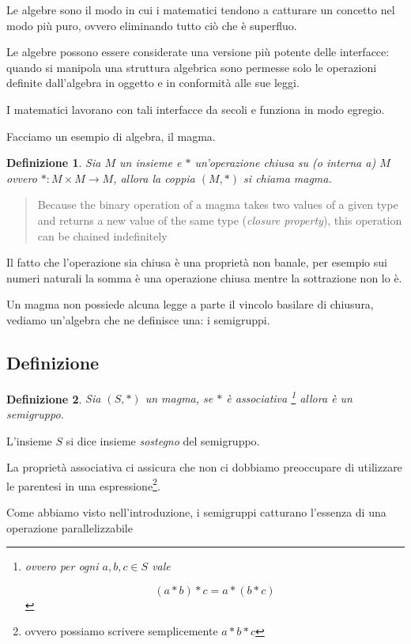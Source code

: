 \documentclass[12pt]{article}
\newtheorem{definition}{Definizione}[section]
\begin{document}
Le algebre sono il modo in cui i matematici tendono a catturare un concetto nel modo più puro,
ovvero eliminando tutto ciò che è superfluo.

Le algebre possono essere considerate una versione più potente delle interfacce: quando si manipola una struttura algebrica
sono permesse solo le operazioni definite dall'algebra in oggetto e in conformità alle sue leggi.

I matematici lavorano con tali interfacce da secoli e funziona in modo egregio.

Facciamo un esempio di algebra, il magma.

\begin{definition}
Sia $M$ un insieme e $*$ un'operazione \emph{chiusa su} (o \emph{interna a}) $M$ ovvero $*: M \times M \rightarrow M$,
allora la coppia $(M, *)$ si chiama \emph{magma}.
\end{definition}

\begin{quote}
Because the binary operation of a magma takes two values of a given type and returns a new value of the same type (\emph{closure property}),
this operation can be chained indefinitely
\end{quote}

Il fatto che l'operazione sia chiusa è una proprietà non banale,
per esempio sui numeri naturali la somma è una operazione chiusa mentre la sottrazione non lo è.

Un magma non possiede alcuna legge a parte il vincolo basilare di chiusura, vediamo un'algebra che ne definisce una: i semigruppi.

\subsection{Definizione}

\begin{definition}
Sia $(S, *)$ un magma, se $*$ è associativa \footnote{ovvero per ogni $a, b, c \in S$ vale

$$
(a * b) * c = a * ( b * c )
$$
} allora è un \emph{semigruppo}.
\end{definition}

L'insieme $S$ si dice insieme \emph{sostegno} del semigruppo.

La proprietà associativa ci assicura che non ci dobbiamo preoccupare di utilizzare le parentesi in una espressione\footnote{ovvero possiamo scrivere semplicemente $a * b * c$}.

Come abbiamo visto nell'introduzione, i semigruppi catturano l'essenza di una operazione parallelizzabile
\end{document}
